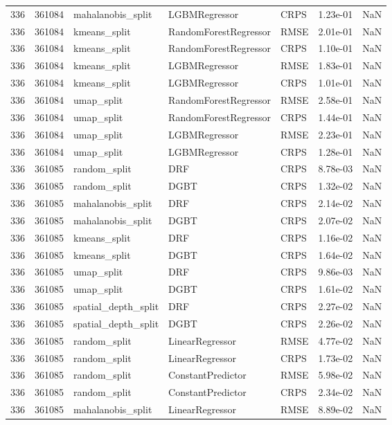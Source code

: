 \begin{tabular}{rrlllrr}
336 & 361084 & mahalanobis\_split & LGBMRegressor & CRPS & 1.23e-01 & NaN \\
336 & 361084 & kmeans\_split & RandomForestRegressor & RMSE & 2.01e-01 & NaN \\
336 & 361084 & kmeans\_split & RandomForestRegressor & CRPS & 1.10e-01 & NaN \\
336 & 361084 & kmeans\_split & LGBMRegressor & RMSE & 1.83e-01 & NaN \\
336 & 361084 & kmeans\_split & LGBMRegressor & CRPS & 1.01e-01 & NaN \\
336 & 361084 & umap\_split & RandomForestRegressor & RMSE & 2.58e-01 & NaN \\
336 & 361084 & umap\_split & RandomForestRegressor & CRPS & 1.44e-01 & NaN \\
336 & 361084 & umap\_split & LGBMRegressor & RMSE & 2.23e-01 & NaN \\
336 & 361084 & umap\_split & LGBMRegressor & CRPS & 1.28e-01 & NaN \\
336 & 361085 & random\_split & DRF & CRPS & 8.78e-03 & NaN \\
336 & 361085 & random\_split & DGBT & CRPS & 1.32e-02 & NaN \\
336 & 361085 & mahalanobis\_split & DRF & CRPS & 2.14e-02 & NaN \\
336 & 361085 & mahalanobis\_split & DGBT & CRPS & 2.07e-02 & NaN \\
336 & 361085 & kmeans\_split & DRF & CRPS & 1.16e-02 & NaN \\
336 & 361085 & kmeans\_split & DGBT & CRPS & 1.64e-02 & NaN \\
336 & 361085 & umap\_split & DRF & CRPS & 9.86e-03 & NaN \\
336 & 361085 & umap\_split & DGBT & CRPS & 1.61e-02 & NaN \\
336 & 361085 & spatial\_depth\_split & DRF & CRPS & 2.27e-02 & NaN \\
336 & 361085 & spatial\_depth\_split & DGBT & CRPS & 2.26e-02 & NaN \\
336 & 361085 & random\_split & LinearRegressor & RMSE & 4.77e-02 & NaN \\
336 & 361085 & random\_split & LinearRegressor & CRPS & 1.73e-02 & NaN \\
336 & 361085 & random\_split & ConstantPredictor & RMSE & 5.98e-02 & NaN \\
336 & 361085 & random\_split & ConstantPredictor & CRPS & 2.34e-02 & NaN \\
336 & 361085 & mahalanobis\_split & LinearRegressor & RMSE & 8.89e-02 & NaN \\

\end{tabular}
